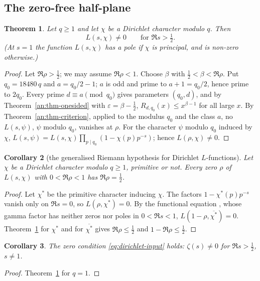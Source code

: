 \documentclass[10pt]{amsart}
\newtheorem{theorem}{Theorem}[section]
\newtheorem{corollary}[theorem]{Corollary}
\theoremstyle{definition}
\theoremstyle{remark}
\begin{document}
\subsection{The zero-free half-plane}\label{an:ssec-GRH}
\begin{theorem}\label{thm:GRH-half}
Let $q\ge1$ and let $\chi$ be a Dirichlet character modulo $q$. Then
\[
 L(s,\chi)\ne0\qquad\text{for }\Re s>\tfrac12 .
\]
\textup{(}At $s=1$ the function $L(s,\chi)$ has a pole if $\chi$ is
principal, and is non-zero otherwise.\textup{)}
\end{theorem}
\begin{proof}
Let $\Re\rho>\frac12$; we may assume $\Re\rho<1$. Choose $\beta$ with
$\frac12<\beta<\Re\rho$. Put $q_0=18480\,q$ and $a=q_0/2-1$; $a$ is odd and
prime to $a+1=q_0/2$, hence prime to $2q_0$. Every prime
$d\equiv a\pmod{q_0}$ gives parameters $(q_0,d)$, and by
Theorem~\ref{an:thm-onesided} with $\varepsilon=\beta-\frac12$,
$R_{d,q_0}(x)\le x^{\beta-1}$ for all large $x$. By
Theorem~\ref{an:thm-criterion}, applied to the modulus $q_0$ and the class
$a$, no $L(s,\psi)$, $\psi$ modulo $q_0$, vanishes at $\rho$. For the
character $\psi$ modulo $q_0$ induced by $\chi$,
$L(s,\psi)=L(s,\chi)\prod_{p\mid q_0}(1-\chi(p)p^{-s})$; hence
$L(\rho,\chi)\ne0$.
\end{proof}

\begin{corollary}[the generalised Riemann hypothesis for Dirichlet $L$-functions]\label{an:cor-GRH}
Let $\chi$ be a Dirichlet character modulo $q\ge1$, primitive or not. Every
zero $\rho$ of $L(s,\chi)$ with $0<\Re\rho<1$ has $\Re\rho=\frac12$.
\end{corollary}
\begin{proof}
Let $\chi^{*}$ be the primitive character inducing $\chi$. The factors
$1-\chi^{*}(p)p^{-s}$ vanish only on $\Re s=0$, so $L(\rho,\chi^{*})=0$. By
the functional equation \cite[Chapters~8 and~9]{Davenport}, whose gamma factor has
neither zeros nor poles in $0<\Re s<1$, $L(1-\rho,\overline{\chi^{*}})=0$.
Theorem~\ref{thm:GRH-half} for $\chi^{*}$ and for $\overline{\chi^{*}}$
gives $\Re\rho\le\frac12$ and $1-\Re\rho\le\frac12$.
\end{proof}

\begin{corollary}\label{an:cor-zeta}
The zero condition \eqref{eq:dirichlet-input} holds: $\zeta(s)\ne0$ for
$\Re s>\frac12$, $s\ne1$.
\end{corollary}
\begin{proof}
Theorem~\ref{thm:GRH-half} for $q=1$.
\end{proof}
\end{document}
